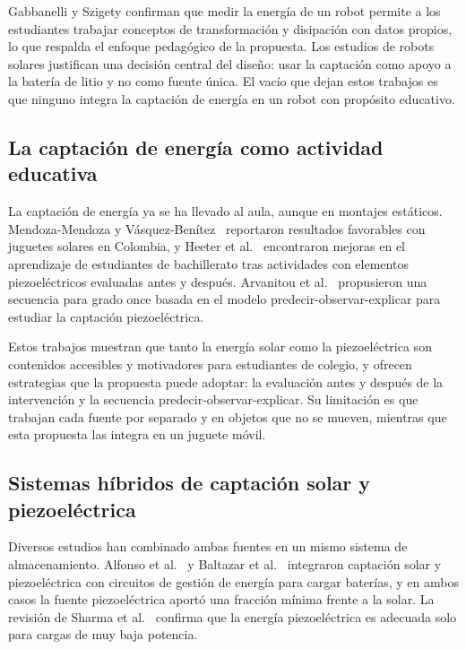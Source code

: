 \documentclass[11pt]{article}
\begin{document}
Gabbanelli y Szigety confirman que medir la energía de un
robot permite a los estudiantes trabajar conceptos de transformación y disipación con
datos propios, lo que respalda el enfoque pedagógico de la propuesta. Los estudios de
robots solares justifican una decisión central del diseño: usar la captación como apoyo
a la batería de litio y no como fuente única. El vacío que dejan estos trabajos es que
ninguno integra la captación de energía en un robot con propósito educativo.
 
\subsection{La captación de energía como actividad educativa}
 
La captación de energía ya se ha llevado al aula, aunque en montajes estáticos.
Mendoza-Mendoza y Vásquez-Benítez~\cite{mendoza2025juguetes} reportaron resultados
favorables con juguetes solares en Colombia, y Heeter et al.~\cite{heeter2016maker}
encontraron mejoras en el aprendizaje de estudiantes de bachillerato tras actividades con
elementos piezoeléctricos evaluadas antes y después. Arvanitou et
al.~\cite{arvanitou2025piezo} propusieron una secuencia para grado once basada en el
modelo predecir-observar-explicar para estudiar la captación piezoeléctrica.
 
Estos trabajos muestran que tanto la energía solar como la
piezoeléctrica son contenidos accesibles y motivadores para estudiantes de colegio, y
ofrecen estrategias que la propuesta puede adoptar: la evaluación antes y después de la
intervención y la secuencia predecir-observar-explicar. Su limitación es que trabajan
cada fuente por separado y en objetos que no se mueven, mientras que esta propuesta las
integra en un juguete móvil.
 
\subsection{Sistemas híbridos de captación solar y piezoeléctrica}
 
Diversos estudios han combinado ambas fuentes en un mismo sistema de almacenamiento.
Alfonso et al.~\cite{alfonso2021plant} y Baltazar et al.~\cite{baltazar2023turnstile}
integraron captación solar y piezoeléctrica con circuitos de gestión de energía para
cargar baterías, y en ambos casos la fuente piezoeléctrica aportó una fracción mínima
frente a la solar. La revisión de Sharma et al.~\cite{sharma2022tiles} confirma que la
energía piezoeléctrica es adecuada solo para cargas de muy baja potencia.
 
\end{document}
